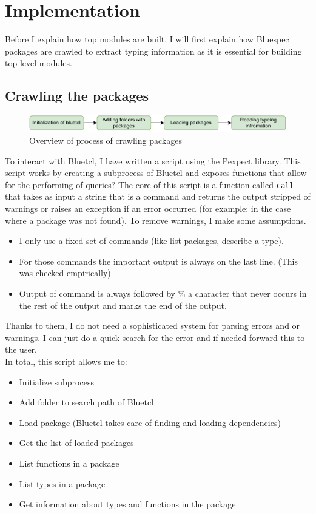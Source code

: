 \documentclass[12pt]{report}
\begin{document}
\chapter{Implementation}
Before I explain how top modules are built, I will first explain how Bluespec packages are crawled to extract typing information as it is essential for building top level modules. 
\section{Crawling the packages}
\begin{figure}[!h]
    \centering
    \caption{Overview of process of crawling packages}

    \includegraphics[width=1.0\columnwidth]{pdfExports/LargeMap-Crawling.drawio.pdf}
\end{figure}
To interact with Bluetcl, I have written a script using the Pexpect library. This script works by creating a subprocess of Bluetcl and exposes functions that allow for the performing of queries? The core of this script is a function called \verb!call! that takes as input a string that is a command and returns the output stripped of warnings or raises an exception if an error occurred (for example: in the case where a package was not found). To remove warnings, I make some assumptions. 
\begin{itemize}
    \item I only use a fixed set of commands (like list packages, describe a type).  
    \item For those commands the important output is always on the last line. (This was checked empirically)   
    \item Output of command is always followed by $\%$ a character that never occurs in the rest of the output and marks the end of the output.  
\end{itemize}   
Thanks to them, I do not need a sophisticated system for parsing errors and or warnings. I can just do a quick search for the error and if needed forward this to the user.  
  \\   
In total, this script allows me to:   
\begin{itemize}   
\item Initialize subprocess   
\item Add folder to search path of Bluetcl   
\item Load package (Bluetcl takes care of finding and loading dependencies)   
\item Get the list of loaded packages   
\item List functions in a package   
\item List types in a package   
\item Get information about types and functions in the package   
\end{itemize} 
\end{document}

